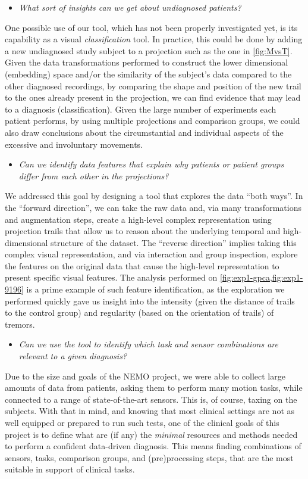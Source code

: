 \begin{itemize}
  \item \emph{What sort of insights can we get about undiagnosed patients?}
\end{itemize}
%
One possible use of our tool, which has not been properly investigated yet, is its capability as a visual \emph{classification} tool. In practice, this could be done by adding a new undiagnosed study subject to a projection such as the one in \cref{fig:MvsT}. Given the data transformations performed to construct the lower dimensional (embedding) space and/or the similarity of the subject's data compared to the other diagnosed recordings, by comparing the shape and position of the new trail to the ones already present in the projection, we can find evidence that may lead to a diagnosis (classification). Given the large number of experiments each patient performs, by using multiple projections and comparison groups, we could also draw conclusions about the circumstantial and individual aspects of the excessive and involuntary movements.

\begin{itemize}
  \item \emph{Can we identify data features that explain why patients or patient groups differ from each other in the projections?}
\end{itemize}
We addressed this goal by designing a tool that explores the data ``both ways''. In the ``forward direction'', we can take the raw data and, via many transformations and augmentation steps, create a high-level complex representation using projection trails that allow us to reason about the underlying temporal and high-dimensional structure of the dataset. The ``reverse direction'' implies taking this complex visual representation, and via interaction and group inspection, explore the features on the original data that cause the high-level representation to present specific visual features.
The analysis performed on \cref{fig:exp1-gpca,fig:exp1-9196} is a prime example of such feature identification, as the exploration we performed quickly gave us insight into the intensity (given the distance of trails to the control group) and regularity (based on the orientation of trails) of tremors.


\begin{itemize}
  \item \emph{Can we use the tool to identify which task and sensor combinations are relevant to a given diagnosis?}
\end{itemize}
Due to the size and goals of the NEMO project, we were able to collect large amounts of data from patients, asking them to perform many motion tasks, while connected to a range of state-of-the-art sensors. This is, of course, taxing on the subjects. With that in mind, and knowing that most clinical settings are not as well equipped or prepared to run such tests, one of the clinical goals of this project is to define what are (if any) the \emph{minimal} resources and methods needed to perform a confident data-driven diagnosis. This means finding combinations of sensors, tasks, comparison groups, and (pre)processing steps, that are the most suitable in support of clinical tasks. 

